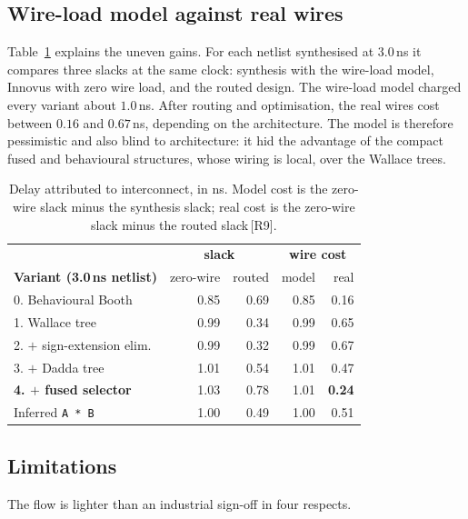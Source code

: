 \documentclass[11pt,a4paper]{article}
\newcommand{\src}[1]{\,{\footnotesize\color{accent}[#1]}}
\begin{document}
\subsection{Wire-load model against real wires}

Table~\ref{tab:wire} explains the uneven gains. For each netlist synthesised
at $3.0$\,ns it compares three slacks at the same clock: synthesis with the
wire-load model, Innovus with zero wire load, and the routed design. The
wire-load model charged every variant about $1.0$\,ns. After routing and
optimisation, the real wires cost between $0.16$ and $0.67$\,ns, depending on
the architecture. The model is therefore pessimistic and also blind to
architecture: it hid the advantage of the compact fused and behavioural
structures, whose wiring is local, over the Wallace trees.

\begin{table}[!ht]
\centering\small
\begin{tabular}{@{}lrrrr@{}}
\toprule
 & \multicolumn{2}{c}{\textbf{slack}} & \multicolumn{2}{c}{\textbf{wire cost}} \\
\textbf{Variant (3.0\,ns netlist)} & zero-wire & routed & model & real \\
\midrule
0. Behavioural Booth             & 0.85 & 0.69 & 0.85 & 0.16 \\
1. Wallace tree                  & 0.99 & 0.34 & 0.99 & 0.65 \\
2. $+$ sign-extension elim.      & 0.99 & 0.32 & 0.99 & 0.67 \\
3. $+$ Dadda tree                & 1.01 & 0.54 & 1.01 & 0.47 \\
\textbf{4. $+$ fused selector}   & 1.03 & 0.78 & 1.01 & \textbf{0.24} \\
\midrule
Inferred \texttt{A * B}          & 1.00 & 0.49 & 1.00 & 0.51 \\
\bottomrule
\end{tabular}
\caption{Delay attributed to interconnect, in ns. Model cost is the
zero-wire slack minus the synthesis slack; real cost is the zero-wire slack
minus the routed slack\src{R9}.}
\label{tab:wire}
\end{table}

\subsection{Limitations}

The flow is lighter than an industrial sign-off in four respects.
\end{document}
